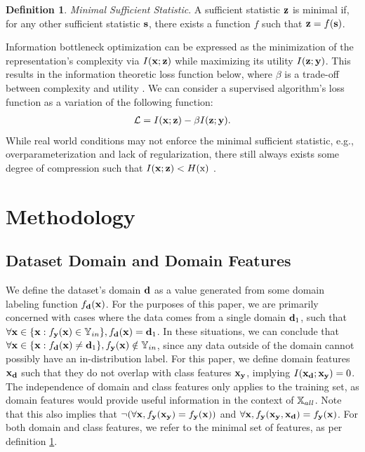 \documentclass[letterpaper]{article} %
\theoremstyle{plain}
\theoremstyle{definition}
\newtheorem{definition}[theorem]{Definition}
\theoremstyle{remark}
\begin{document}
\begin{definition}
\emph{Minimal Sufficient Statistic}. A sufficient statistic ${\mathbf{z}}$ is minimal if, for any other sufficient statistic ${\mathbf{s}}$, there exists a function $f$ such that ${\mathbf{z}} = f({\mathbf{s}})$.
\label{defineminsuff}
\end{definition}
Information bottleneck optimization can be expressed as the minimization of the representation's complexity via $I({\mathbf{x}};{\mathbf{z}})$ while maximizing its utility $I({\mathbf{z}};{\mathbf{y}})$. This results in the information theoretic loss function below, where $\beta$ is a trade-off between complexity and utility \citep{shwartz2023compress}. We can consider a supervised algorithm's loss function as a variation of the following function:
\begin{align}
\mathcal{L}=I({\mathbf{x}} ; {\mathbf{z}})-\beta I({\mathbf{z}} ;{\mathbf{y}}).
\end{align}
While real world conditions may not enforce the minimal sufficient statistic, e.g., overparameterization and lack of regularization, there still always exists some degree of compression such that $I({\mathbf{x}} ; {\mathbf{z}})<H({\textnormal{x}})$ \citep{shwartz2017opening}. 

\section{Methodology}
\label{sec:method}

\subsection{Dataset Domain and Domain Features}

We define the dataset's domain ${\mathbf{d}}$ as a value generated from some domain labeling function $f_{{\mathbf{d}}}({\mathbf{x}})$. For the purposes of this paper, we are primarily concerned with cases where the data comes from a single domain ${\mathbf{d}}_1$, such that $\forall {\mathbf{x}} \in  \{{\mathbf{x}} : f_{{\mathbf{y}}}({\mathbf{x}}) \in  {\mathbb{Y}}_{in}\}, f_{{\mathbf{d}}}({\mathbf{x}}) = {\mathbf{d}}_1$. In these situations, we can conclude that $\forall {\mathbf{x}} \in \{{\mathbf{x}} : f_{{\mathbf{d}}}({\mathbf{x}}) \neq {\mathbf{d}}_1\}, f_{{\mathbf{y}}}({\mathbf{x}}) \notin {\mathbb{Y}}_{in}$, since any data outside of the domain cannot possibly have an in-distribution label.
For this paper, we define domain features ${\mathbf{x}}_{\mathbf{d}}$ such that they do not overlap with class features ${\mathbf{x}}_{\mathbf{y}}$, implying $I({\mathbf{x}}_{\mathbf{d}};{\mathbf{x}}_{\mathbf{y}}) = 0$. The independence of domain and class features only applies to the training set, as domain features would provide useful information in the context of ${\mathbb{X}}_{all}$. Note that this also implies that $\neg(\forall{\mathbf{x}},  f_{\mathbf{y}}({\mathbf{x}}_{\mathbf{y}}) = f_{\mathbf{y}}({\mathbf{x}}))$ and $\forall{\mathbf{x}}, f_{\mathbf{y}}({\mathbf{x}}_{\mathbf{y}}, {\mathbf{x}}_{\mathbf{d}}) = f_{\mathbf{y}}({\mathbf{x}})$. For both domain and class features, we refer to the minimal set of features, as per definition \ref{defineminsuff}.
\end{document}
